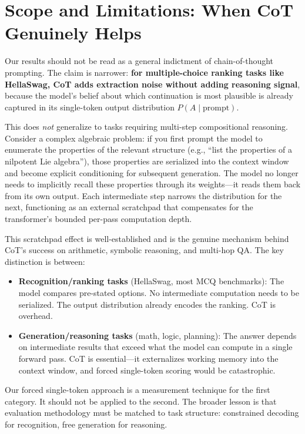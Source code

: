 \documentclass[11pt]{article}
\begin{document}
\section{Scope and Limitations: When CoT Genuinely Helps}

Our results should not be read as a general indictment of chain-of-thought prompting. The claim is narrower: \textbf{for multiple-choice ranking tasks like HellaSwag, CoT adds extraction noise without adding reasoning signal}, because the model's belief about which continuation is most plausible is already captured in its single-token output distribution $P(A \mid \text{prompt})$.

This does \emph{not} generalize to tasks requiring multi-step compositional reasoning. Consider a complex algebraic problem: if you first prompt the model to enumerate the properties of the relevant structure (e.g., ``list the properties of a nilpotent Lie algebra''), those properties are serialized into the context window and become explicit conditioning for subsequent generation. The model no longer needs to implicitly recall these properties through its weights---it reads them back from its own output. Each intermediate step narrows the distribution for the next, functioning as an external scratchpad that compensates for the transformer's bounded per-pass computation depth.

This scratchpad effect is well-established \citep{wei2022} and is the genuine mechanism behind CoT's success on arithmetic, symbolic reasoning, and multi-hop QA. The key distinction is between:

\begin{itemize}
    \item \textbf{Recognition/ranking tasks} (HellaSwag, most MCQ benchmarks): The model compares pre-stated options. No intermediate computation needs to be serialized. The output distribution already encodes the ranking. CoT is overhead.
    \item \textbf{Generation/reasoning tasks} (math, logic, planning): The answer depends on intermediate results that exceed what the model can compute in a single forward pass. CoT is essential---it externalizes working memory into the context window, and forced single-token scoring would be catastrophic.
\end{itemize}

Our forced single-token approach is a measurement technique for the first category. It should not be applied to the second. The broader lesson is that evaluation methodology must be matched to task structure: constrained decoding for recognition, free generation for reasoning.
\end{document}
